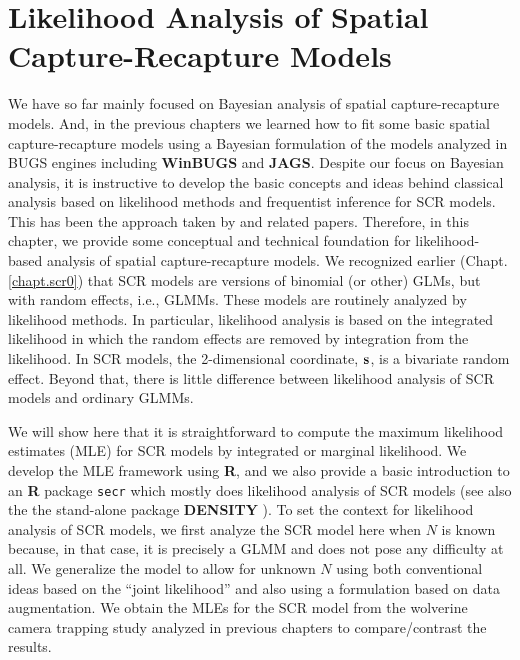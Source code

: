 \chapter{
Likelihood Analysis of Spatial Capture-Recapture Models
}
\label{chapt.mle}

\vspace{.3in}

We have so far mainly focused on Bayesian analysis of spatial
capture-recapture models. And, in the previous chapters we learned how
to fit some basic spatial capture-recapture models using a Bayesian
formulation of the models analyzed in BUGS engines including {\bf
  WinBUGS} and {\bf JAGS}.  Despite our focus on Bayesian analysis, it
is instructive to develop the basic concepts and ideas behind
classical analysis based on likelihood methods and frequentist
inference for SCR models. This has been the approach taken by
\citet{borchers_efford:2008, dawson_efford:2009} and related papers.
Therefore, in this chapter, we provide some conceptual and technical
foundation for likelihood-based analysis of spatial capture-recapture
models. We recognized earlier (Chapt. \ref{chapt.scr0}) that SCR
models are versions of binomial (or other) GLMs, but with random
effects, i.e., GLMMs. These models are routinely analyzed by
likelihood methods. In particular, likelihood analysis is based on the
integrated likelihood in which the random effects are removed by
integration from the likelihood. In SCR models, the 2-dimensional
coordinate, ${\bf s}$, is a bivariate random effect. Beyond that,
there is little difference between likelihood analysis of SCR models
and ordinary GLMMs.

We will show here that it is straightforward to compute the maximum
likelihood estimates (MLE) for SCR models by integrated or marginal
likelihood. We develop the MLE framework using {\bf R}, and we also
provide a basic introduction to an {\bf R} package \mbox{\tt secr}
\citep{efford:2011} which mostly does likelihood analysis of SCR
models (see also the the stand-alone package {\bf DENSITY}
\citep{efford_etal:2004}).  To set the context for likelihood analysis
of SCR models, we first analyze the SCR model here when $N$ is known
because, in that case, it is precisely a GLMM and does not pose any
difficulty at all. We generalize the model to allow for unknown $N$
using both conventional ideas based on the ``joint likelihood''
\citep[e.g.,][]{borchers_etal:2002} and also using a formulation based
on data augmentation.  We obtain the MLEs for the SCR model from the
wolverine camera trapping study \citep{magoun_etal:2011} analyzed in
previous chapters to compare/contrast the results.

